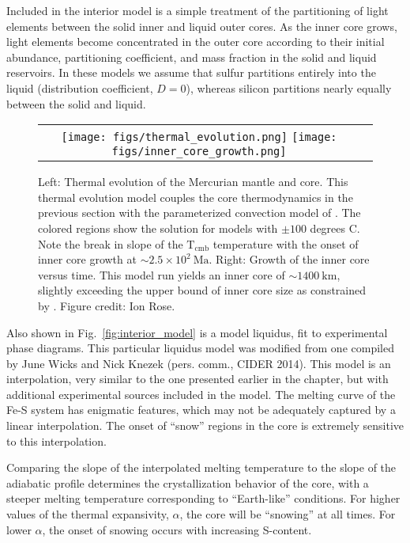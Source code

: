 Included in the interior model is a simple treatment of the partitioning of light
elements between the solid inner and liquid outer cores. As the inner core grows,
light elements become concentrated in the outer core according to their initial
abundance, partitioning coefficient, and mass fraction in the solid and liquid
reservoirs. In these models we assume that sulfur partitions entirely into the liquid
(distribution coefficient, $D=0$), whereas silicon partitions nearly equally between
the solid and liquid.

 \begin{figure}[h] %
   \centering
\begin{tabular}{cc}
 \texttt{[image: figs/thermal\_evolution.png]}
 \texttt{[image: figs/inner\_core\_growth.png]}
\end{tabular}
\caption{Left: Thermal evolution of the Mercurian mantle and core. This
  thermal evolution model couples the core thermodynamics in the previous section
  with the parameterized convection model of \citep{Stevenson1983}. The colored
  regions show the solution for models with $\pm \mathrm{100}$ degrees C. Note the
  break in slope of the $\mathrm{T_{cmb}}$ temperature with the onset of inner core
  growth at $\sim 2.5\times10^2~\mathrm{Ma}$. Right: Growth of the inner core versus
  time. This model run yields an inner core of $ \sim 1400~\mathrm{km}$, slightly
  exceeding the upper bound of inner core size as constrained by \citep{Dumberry2015}.
  Figure credit: Ion Rose.}
  \label{fig:thermal}
\end{figure}

Also shown in Fig.~\ref{fig:interior_model} is a model liquidus, fit to experimental
phase diagrams. This particular liquidus model was modified from one compiled by June
Wicks and Nick Knezek (pers. comm., CIDER 2014). This model is an interpolation, very
similar to the one presented earlier in the chapter, but with additional experimental
sources included in the model. The melting curve of the Fe-S system has enigmatic
features, which may not be adequately captured by a  linear interpolation. The onset
of ``snow'' regions in the core is extremely sensitive to this interpolation. 

Comparing the slope of the interpolated melting temperature to the slope of the
adiabatic profile determines the crystallization behavior of the core, with a
steeper melting temperature corresponding to  ``Earth-like'' conditions. For higher
values of the thermal expansivity, $\alpha$, the core will be ``snowing'' at all
times. For lower $\alpha$, the onset of snowing occurs with increasing S-content.

